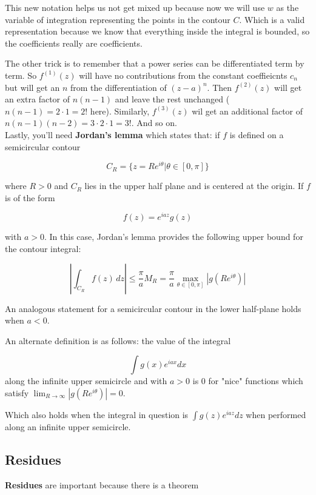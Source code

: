 This new notation helps us not get mixed up because now we will use $w$ as the variable of integration
representing the points in the contour $C$.
Which is a valid representation because we know that everything inside the integral is bounded,
so the coefficients really are coefficients.

The other trick is to remember that a power series can be differentiated term by term.
So $f^{(1)}(z)$ will have no contributions from the constant coeffieicnts $c_n$ but will get an $n$
from the differentiation of $\left(z-a\right)^n$.
Then $f^{(2)}(z)$ will get an extra factor of $n(n-1)$ and leave the rest unchanged ($n(n-1) = 2\cdot1 = 2!$ here).
Similarly,
$f^{(3)}(z)$ wil get an additional factor of $n(n-1)(n-2) = 3\cdot 2 \cdot 1 = 3!$.
And so on.
\\

Lastly, you'll need \textbf{Jordan's lemma} which states that:
if $f$ is defined on a semicircular contour

$$
C_{R} = \{ z = Re^{i\theta} | \theta \in [0, \pi] \}
$$

where $R > 0$ and $C_R$ lies in the upper half plane and is centered at the origin.
If $f$ is of the form

$$
f(z) = e^{iaz} g(z)
$$

with $a>0$.
In this case, Jordan's lemma provides the following upper bound for the contour integral:

$$
\left| \int_{C_{R}} f(z) \, dz \right| \leq \frac{\pi}{a} M_R
    = \frac{\pi}{a} \max_{\theta \in [0,\pi]} \left| g \left(Re^{i\theta}\right) \right|
$$

An analogous statement for a semicircular contour in the lower half-plane holds when $a < 0$. 

An alternate definition is as follows:
the value of the integral

$$
\int g(x) e^{iax} dx
$$
along the infinite upper semicircle and with $a>0$ is 0 for "nice" functions which satisfy
$\lim_{R\rightarrow \infty} \left| g\left(Re^{i\theta}\right) \right| = 0$.

Which also holds when the integral in question is $\int g(z) e^{iaz} dz$ when performed along
an infinite upper semicircle.

\subsection{Residues}

\textbf{Residues} are important because there is a theorem